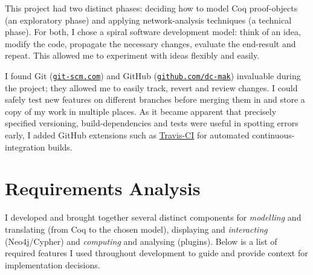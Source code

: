 This project had two distinct phases: deciding how to model Coq proof-objects
(an exploratory phase) and applying network-analysis techniques (a technical
phase). For both, I chose a spiral software development model: think of an idea,
modify the code, propagate the necessary changes, evaluate the end-result and
repeat. This allowed me to experiment with ideas flexibly and easily.

I found Git (\href{http://git-scm.com}{\texttt{git-scm.com}}) and GitHub
(\href{http://github.com/dc-mak}{\texttt{github.com/dc-mak}}) invaluable during
the project; they allowed me to easily track, revert and review changes. I could
safely test new features on different branches before merging them in and store
a copy of my work in multiple places. As it became apparent that precisely
specified versioning, build-dependencies and tests were useful in spotting
errors early, I added GitHub extensions such as
\href{https://travis-ci.org}{Travis-CI} for automated continuous-integration
builds.

\section{Requirements Analysis}

I developed and brought together several distinct components for
\emph{modelling} and translating (from Coq to the chosen model), displaying and
\emph{interacting} (Neo4j/Cypher) and \emph{computing} and analysing (plugins).
Below is a list of required features I used throughout development to guide and
provide context for implementation decisions.


